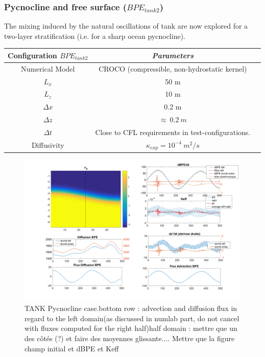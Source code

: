 \subsubsection{Pycnocline and free surface ({$BPE_{tank2}$})}
The mixing induced by the natural oscillations of tank are now explored for a two-layer stratification (i.e. for a sharp ocean pycnocline).
\begin{table}[h]
        \centering
        \begin{tabular}{|c|c|c|}
                \hline
                Configuration $BPE_{tank2}$ & \textit{Parameters}\\
                \hline 
                Numerical Model & CROCO (compressible, non-hydrostatic kernel)\\
                $L_x$ & 50 m\\
                $L_z$ & 10 m\\
                $\Delta x$ & 0.2 m\\
                $\Delta z$ & $\approx\ 0.2\ m$\\
                $\Delta t$ & Close to CFL requirements in test-configurations.\\
                Diffusivity & $\kappa_{exp} = 10^{-4} \ m^2/s$\\
                \hline
        \end{tabular}
        \label{tab_BPE_TANK2}
\end{table}
\begin{figure}[h!]
\centering
\includegraphics[width=1\textwidth]{./CHAP_BPE/AGBPE_numlab7.png}
\caption{TANK Pycnocline case.bottom row : advection and diffusion flux in regard to the left domain(as discussed in numlab part, do not cancel with fluxes computed for the right half)\color{red}half domain : mettre que un des côtés (?) et faire des moyennes glissante.... Mettre que la figure champ initial et dBPE et Keff\color{black}}
\label{figCpsin}
\end{figure}

